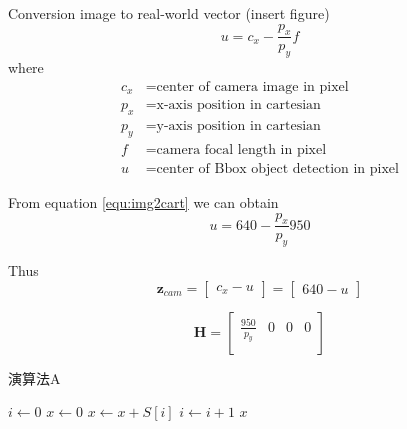 Conversion image to real-world vector (insert figure)
\begin{equation}\label{equ:img2cart}
u=c_x-\frac{p_x}{p_y}f
\end{equation}
where
\begin{align*}
    c_x &=\text{center of camera image in pixel}\\
    p_x &=\text{x-axis position in cartesian}\\
    p_y &=\text{y-axis position in cartesian}\\
    f &=\text{camera focal length in pixel}\\
    u &=\text{center of Bbox object detection in pixel}
\end{align*}

From equation \ref{equ:img2cart} we can obtain
\begin{equation}\label{equ:2-img2cart2}
    u=640-\frac{p_x}{p_y}950
\end{equation}

Thus
\begin{equation}\label{equ:2-z_cam}
    \mathbf{z}_{cam}=
    \begin{bmatrix}c_x-u\end{bmatrix}=
    \begin{bmatrix}640-u\end{bmatrix}
\end{equation}

\begin{equation}\label{equ:2-cam_transition_matrix}
    \mathbf{H} = 
    \begin{bmatrix}
        \frac{950}{p_y} & 0 & 0 & 0 \\
      \end{bmatrix}
\end{equation}



\begin{algorithm}[htbp]
    \SetAlgoNoLine

    \caption{演算法A}
    \label{algo:algoexample}



    \AlgoHRule

    $i \gets 0$\;
    $x \gets 0$\;
    \;
    {
        $x \gets x + S[i]$\;
        $i  \gets i + 1$\;
    }
    \BlankLine
    \Return $x$\;
\end{algorithm}